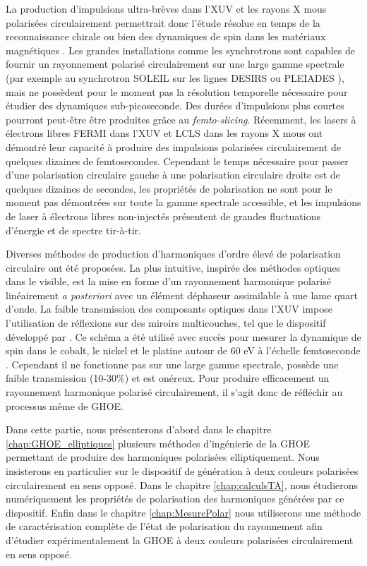 La production d'impulsions ultra-brèves dans l'XUV et les rayons X mous polarisées circulairement permettrait donc l'étude résolue en temps de la reconnaissance chirale  ou bien des dynamiques de spin dans les matériaux magnétiques . Les grandes installations comme les synchrotrons sont capables de fournir un rayonnement polarisé circulairement sur une large gamme spectrale (par exemple au synchrotron SOLEIL sur les lignes DESIRS  ou PLEIADES ), mais ne possèdent pour le moment pas la résolution temporelle nécessaire pour étudier des dynamiques sub-picoseconde. Des durées d'impulsions plus courtes pourront peut-être être produites grâce au \textit{femto-slicing}. Récemment, les lasers à électrons libres FERMI dans l'XUV  et LCLS dans les rayons X mous  ont démontré leur capacité à produire des impulsions polarisées circulairement de quelques dizaines de femtosecondes. Cependant le temps nécessaire pour passer d'une polarisation circulaire gauche à une polarisation circulaire droite est de quelques dizaines de secondes, les propriétés de polarisation ne sont pour le moment pas démontrées sur toute la gamme spectrale accessible, et les impulsions de laser à électrons libres non-injectés présentent de grandes fluctuations d'énergie et de spectre tir-à-tir.

Diverses méthodes de production d'harmoniques d'ordre élevé de polarisation circulaire ont été proposées. La plus intuitive, inspirée des méthodes optiques dans le visible, est la mise en forme d'un rayonnement harmonique polarisé linéairement \textit{a posteriori} avec un élément déphaseur assimilable à une lame quart d'onde. La faible transmission des composants optiques dans l'XUV impose l'utilisation de réflexions sur des miroirs multicouches, tel que le dispositif développé par . Ce schéma a été utilisé avec succès pour mesurer la dynamique de spin dans le cobalt, le nickel et le platine autour de 60 eV à l'échelle femtoseconde . Cependant il ne fonctionne pas sur une large gamme spectrale, possède une faible transmission (10-30\%) et est onéreux. Pour produire efficacement un rayonnement harmonique polarisé circulairement, il s'agit donc de réfléchir au processus même de GHOE.

Dans cette partie, nous présenterons d'abord dans le chapitre \ref{chap:GHOE_elliptiques} plusieurs méthodes d'ingénierie de la GHOE permettant de produire des harmoniques polarisées elliptiquement. Nous insisterons en particulier sur le dispositif de génération à deux couleurs polarisées circulairement en sens opposé. Dans le chapitre \ref{chap:calculsTA}, nous étudierons numériquement les propriétés de polarisation des harmoniques générées par ce dispositif. Enfin dans le chapitre \ref{chap:MesurePolar} nous utiliserons une méthode de caractérisation complète de l'état de polarisation du rayonnement afin d'étudier expérimentalement la GHOE à deux couleurs polarisées circulairement en sens opposé.

